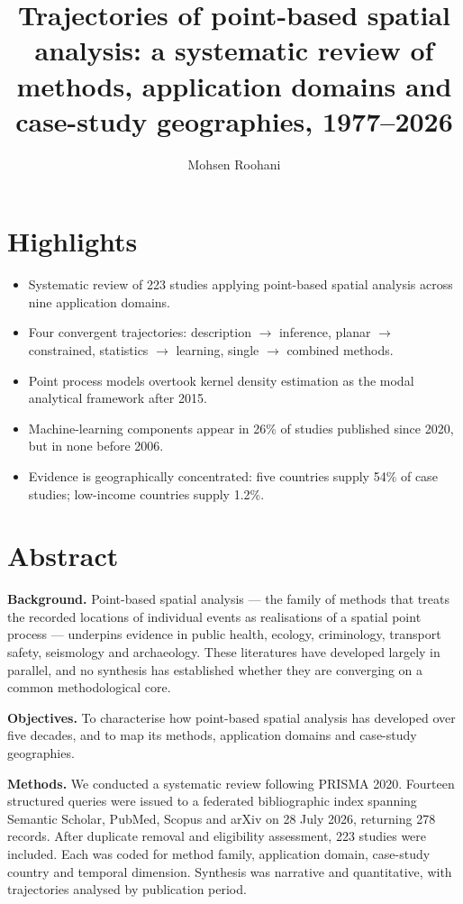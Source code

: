 \documentclass[11pt,a4paper]{article}
\title{\textbf{Trajectories of point-based spatial analysis: a systematic
review of methods, application domains and case-study geographies,
1977--2026}}
\author[1]{Mohsen Roohani}
\affil[1]{\small Affiliation to be completed}
\date{}
\begin{document}
\maketitle

\section*{Highlights}
\begin{itemize}\itemsep2pt
  \item Systematic review of 223 studies applying point-based spatial
        analysis across nine application domains.
  \item Four convergent trajectories: description $\rightarrow$ inference,
        planar $\rightarrow$ constrained, statistics $\rightarrow$ learning,
        single $\rightarrow$ combined methods.
  \item Point process models overtook kernel density estimation as the modal
        analytical framework after 2015.
  \item Machine-learning components appear in 26\% of studies published since
        2020, but in none before 2006.
  \item Evidence is geographically concentrated: five countries supply 54\% of
        case studies; low-income countries supply 1.2\%.
\end{itemize}

\section*{Abstract}
\noindent
\textbf{Background.} Point-based spatial analysis --- the family of methods
that treats the recorded locations of individual events as realisations of a
spatial point process --- underpins evidence in public health, ecology,
criminology, transport safety, seismology and archaeology. These literatures
have developed largely in parallel, and no synthesis has established whether
they are converging on a common methodological core.

\noindent
\textbf{Objectives.} To characterise how point-based spatial analysis has
developed over five decades, and to map its methods, application domains and
case-study geographies.

\noindent
\textbf{Methods.} We conducted a systematic review following PRISMA 2020.
Fourteen structured queries were issued to a federated bibliographic index
spanning Semantic Scholar, PubMed, Scopus and arXiv on 28 July 2026, returning
278 records. After duplicate removal and eligibility assessment, 223 studies
were included. Each was coded for method family, application domain,
case-study country and temporal dimension. Synthesis was narrative and
quantitative, with trajectories analysed by publication period.
\end{document}
